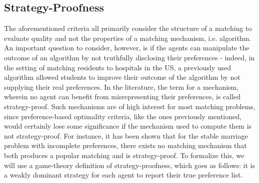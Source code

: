 \subsection{Strategy-Proofness}
The aforementioned criteria all primarily consider the structure of a matching to evaluate quality and not the properties of a matching mechanism, i.e. algorithm. An important question to consider, however, is if the agents can manipulate the outcome of an algorithm by not truthfully disclosing their preferences - indeed, in the setting of matching residents to hospitals in the US, a previously used algorithm allowed students to improve their outcome of the algorithm by not supplying their real preferences.\cite{Gusfield} In the literature, the term for a mechanism, wherein no agent can benefit from misrepresenting their preferences, is called strategy-proof. \cite{Klaus} Such mechanisms are of high interest for most matching problems, since preference-based optimality criteria, like the ones previously mentioned, would certainly lose some significance if the mechanism used to compute them is not strategy-proof.
For instance, it has been shown \cite{ROTH1982127} that for the stable marriage problem with incomplete preferences, there exists no matching mechanism that both produces a popular matching and is strategy-proof.
To formalize this, we will use a game-theory definition of strategy-proofness, which goes as follows: it is a weakly dominant strategy for each agent to report their true preference list. \cite{Klaus}


